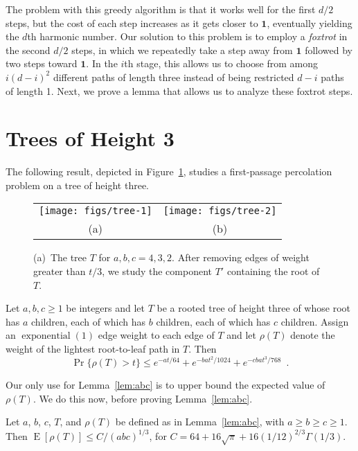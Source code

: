 \documentclass[a4paper,UKenglish]{lipics-v2016}
\DeclareMathOperator{\E}{E}
\DeclareMathOperator{\exponential}{exponential}
\newcommand{\one}{\mathbf{1}}
\begin{document}
The problem with this greedy algorithm is that it works well for the
first $d/2$ steps, but the cost of each step increases as it gets closer
to $\one$, eventually yielding the $d$th harmonic number.  Our solution
to this problem is to employ a \emph{foxtrot} in the second $d/2$ steps,
in which we repeatedly take a step away from $\one$ followed by two steps
toward $\one$.  In the $i$th stage, this allows us to choose from among
$i(d-i)^2$ different paths of length three instead of being restricted
$d-i$ paths of length 1. Next, we prove a lemma that allows us to analyze these foxtrot steps.


\section{Trees of Height 3}
\label{sec:abc}

The following result, depicted in Figure~\ref{fig:tree}, studies a
first-passage percolation problem on a tree of height three.

\begin{figure}
   \begin{center}
     \begin{tabular}{cc}
       \texttt{[image: figs/tree-1]} & \texttt{[image: figs/tree-2]} \\
       (a) & (b)
     \end{tabular}
   \end{center}
   \caption{(a)~The tree $T$ for $a,b,c=4,3,2$.  After removing edges of weight greater than $t/3$, we study the component $T'$ containing the root of $T$.}
   \label{fig:tree}
\end{figure}


\begin{lemma}\label{lem:abc}
Let $a,b,c\ge 1$ be integers and let $T$ be a rooted tree of height
three of whose root has $a$ children, each of which has $b$ children,
each of which has $c$ children.  Assign an $\exponential(1)$ edge weight
to each edge of $T$ and let $\rho(T)$ denote the weight of the lightest
root-to-leaf path in $T$.  Then
\[
    \Pr\{\rho(T) > t\} \le e^{-at/64} + e^{-bat^2/1024} + e^{-cbat^3/768} \enspace .
\] 
\end{lemma}

Our only use for Lemma~\ref{lem:abc} is to upper bound the expected
value of $\rho(T)$.  We do this now, before proving
Lemma~\ref{lem:abc}.

\begin{corollary}\label{cor:expectation}
  Let $a$, $b$, $c$, $T$, and $\rho(T)$ be defined as in Lemma~\ref{lem:abc},
  with $a\ge b\ge c\ge 1$.  Then $\E[\rho(T)] \le C/(abc)^{1/3}$, for
  $C=64 + 16\sqrt{\pi} + 16(1/12)^{2/3}\Gamma(1/3)$.
\end{corollary}
\end{document}
